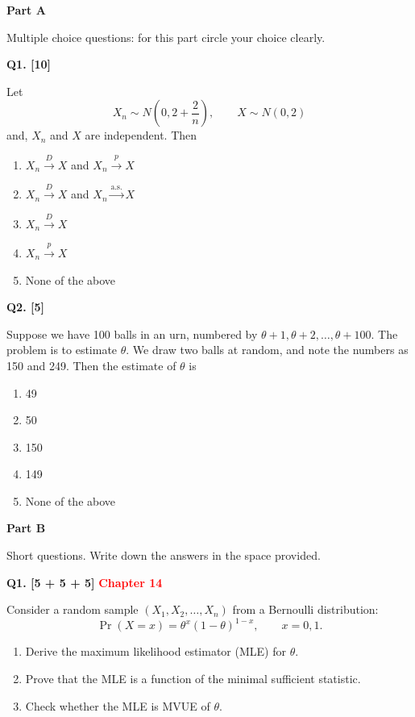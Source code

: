 \documentclass[11pt]{article}
\begin{document}
\vspace{1em}

\begin{center}
\textbf{Part A}
\end{center}

\begingroup
\small
\setlength{\parskip}{0.1em}
Multiple choice questions: for this part circle your choice clearly.

\medskip
\textbf{Q1. [10]}

Let
\[
X_n\sim N\!\left(0,2+\frac{2}{n}\right),\qquad X\sim N(0,2)
\]
and, $X_n$ and $X$ are independent. Then
\begin{enumerate}
\setlength{\itemsep}{0pt}\setlength{\parsep}{0pt}\setlength{\topsep}{2pt}
\item[(a)] $X_n\xrightarrow{D}X$ and $X_n\xrightarrow{p}X$
\item[(b)] $X_n\xrightarrow{D}X$ and $X_n\xrightarrow{\mathrm{a.s.}}X$
\item[(c)] $X_n\xrightarrow{D}X$
\item[(d)] $X_n\xrightarrow{p}X$
\item[(e)] None of the above
\end{enumerate}

\medskip
\textbf{Q2. [5]}

Suppose we have 100 balls in an urn, numbered by $\theta+1,\theta+2,\ldots,\theta+100$. The problem is to estimate $\theta$. We draw two balls at random, and note the numbers as 150 and 249. Then the estimate of $\theta$ is
\begin{enumerate}
\setlength{\itemsep}{0pt}\setlength{\parsep}{0pt}\setlength{\topsep}{2pt}
\item[(a)] 49
\item[(b)] 50
\item[(c)] 150
\item[(d)] 149
\item[(e)] None of the above
\end{enumerate}
\endgroup

\clearpage
\begin{center}
\textbf{Part B}
\end{center}

Short questions. Write down the answers in the space provided.

\medskip
\textbf{Q1. [5 + 5 + 5]}  \textbf{\textcolor{red}{Chapter 14}} 

Consider a random sample $(X_1,X_2,\ldots,X_n)$ from a Bernoulli distribution:
\[
\Pr(X=x)=\theta^{x}(1-\theta)^{1-x},\qquad x=0,1.
\]
\begin{enumerate}
\setlength{\itemsep}{4pt}\setlength{\parsep}{0pt}\setlength{\topsep}{3pt}
\item[(a)] Derive the maximum likelihood estimator (MLE) for $\theta$.
\item[(b)] Prove that the MLE is a function of the minimal sufficient statistic.
\item[(c)] Check whether the MLE is MVUE of $\theta$.
\end{enumerate}
\end{document}
